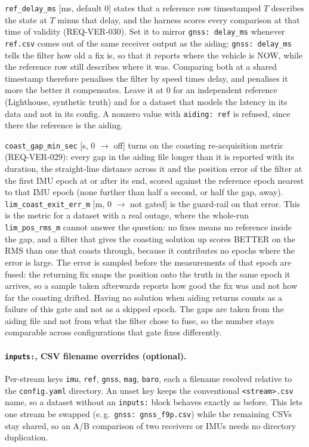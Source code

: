\documentclass[11pt,a4paper]{article}
\newcommand{\code}[1]{\texttt{#1}}
\begin{document}
\code{ref\_\allowbreak{}delay\_\allowbreak{}ms} [ms, default 0] states that a reference row
timestamped $T$ describes the state at $T$ minus that delay, and the harness
scores every comparison at that time of validity (REQ-VER-030). Set it to
mirror \code{gnss: delay\_\allowbreak{}ms} whenever \code{ref.csv} comes out of the same
receiver output as the aiding: \code{gnss: delay\_\allowbreak{}ms} tells the filter how old
a fix is, so that it reports where the vehicle is NOW, while the reference row
still describes where it was. Comparing both at a shared timestamp therefore
penalises the filter by speed times delay, and penalises it more the
better it compensates. Leave it at 0 for an independent reference (Lighthouse,
synthetic truth) and for a dataset that models the latency in its data and not in
its config. A nonzero value with \code{aiding: ref} is refused, since
there the reference is the aiding.

\code{coast\_\allowbreak{}gap\_\allowbreak{}min\_\allowbreak{}sec} [s, 0 $\to$ off] turns on the
coasting re-acquisition metric (REQ-VER-029): every gap in the aiding file
longer than it is reported with its duration, the straight-line distance
across it and the position error of the filter at the first IMU epoch at or
after its end, scored against the reference epoch nearest to that IMU epoch (none
further than half a second, or half the gap, away).
\code{lim\_\allowbreak{}coast\_\allowbreak{}exit\_\allowbreak{}err\_\allowbreak{}m} [m, 0 $\to$ not
gated] is the guard-rail on that error. This is the metric for a dataset with
a real outage, where the whole-run \code{lim\_\allowbreak{}pos\_\allowbreak{}rms\_\allowbreak{}m} cannot
answer the question: no fixes means no reference inside the gap, and a filter
that gives the coasting solution up scores BETTER on the RMS than one that
coasts through, because it contributes no epochs where the error is large.
The error is sampled before the measurements of that epoch are fused: the
returning fix snaps the position onto the truth in the same epoch it arrives,
so a sample taken afterwards reports how good the fix was and not how far
the coasting drifted. Having no solution when aiding returns counts as a
failure of this gate and not as a skipped epoch. The gaps are taken from the
aiding file and not from what the filter chose to fuse, so the number stays
comparable across configurations that gate fixes differently.

\paragraph{\code{inputs:}, CSV filename overrides (optional).}
Per-stream keys \code{imu}, \code{ref}, \code{gnss}, \code{mag}, \code{baro},
each a filename resolved relative to the \code{config.yaml} directory. An unset
key keeps the conventional \code{<stream>.csv} name, so a dataset without an
\code{inputs:} block behaves exactly as before. This lets one stream be swapped
(e.\,g.\ \code{gnss: gnss\_\allowbreak{}f9p.csv}) while the remaining CSVs stay shared, so an
A/B comparison of two receivers or IMUs needs no directory duplication.
\end{document}
